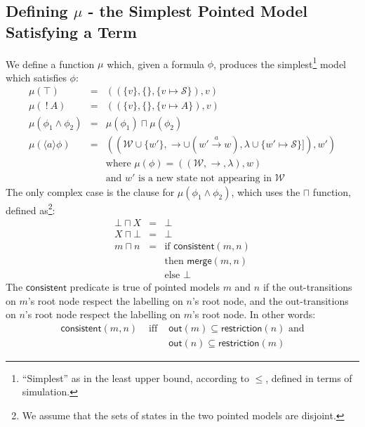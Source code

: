 \documentclass[smallextended]{svjour3}       %
\numberwithin{subcase}{mycase}
\def\fBang {\ ! \ }
\begin{document}
\subsection{Defining $\mu$ - the Simplest Pointed Model Satisfying a Term}
We define a function $\mu$ which, given a formula $\phi$, produces the simplest\footnote{``Simplest'' as in the least upper bound, according to $\leq$, defined in terms of simulation.} model which satisfies $\phi$:
\begin{eqnarray}
\mu (\top) & = & ( (\{v\}, \{\}, \{v \mapsto \mathcal{S}\}), v) \nonumber \\
\mu (\fBang A) & = & ( (\{v\}, \{\}, \{v \mapsto A\}), v) \nonumber \\
\mu (\phi_1 \land \phi_2) & = & \mu(\phi_1) \sqcap \mu(\phi_2) \nonumber \\
\mu (\langle a \rangle \phi) & = & ( (\mathcal{W} \cup \{w'\}, \rightarrow \cup (w' \xrightarrow{a} w), \lambda \cup \{w' \mapsto \mathcal{S}\}]), w') \nonumber \\
		& & \mbox{where }\mu(\phi) = ( (\mathcal{W}, \rightarrow, \lambda), w) \nonumber \\
		& & \mbox{and }w' \mbox{ is a new state not appearing in }\mathcal{W} \nonumber
\end{eqnarray}
The only complex case is the clause for $\mu (\phi_1 \land \phi_2)$, which uses the $\sqcap$ function, defined as\footnote{We assume that the sets of states in the two pointed models are disjoint.}:
\begin{eqnarray}
\bot \sqcap X & = & \bot \nonumber \\
X \sqcap \bot & = & \bot \nonumber \\
m \sqcap n & = & \mbox{if } \mathsf{consistent}(m, n)\nonumber \\
	& & \mbox{then } \mathsf{merge}(m, n) \nonumber \\
	& & \mbox{else } \bot \nonumber
\end{eqnarray}
The $\mathsf{consistent}$ predicate is true of pointed models $m$ and $n$ if the out-transitions on $m$'s root node respect the labelling on $n$'s root node, and the out-transitions on $n$'s root node respect the labelling on $m$'s root node. In other words:
\begin{eqnarray}
\mathsf{consistent}(m, n) & \mbox{ iff } & \mathsf{out}(m) \subseteq \mathsf{restriction}(n) \mbox{ and} \nonumber \\
& & \mathsf{out}(n) \subseteq \mathsf{restriction}(m) \nonumber
\end{eqnarray}
\end{document}
